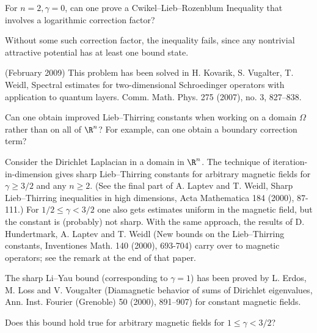 \documentclass[12pt,letterpaper, reqno]{amsart}
\begin{document}
\begin{problemblock}


\begin{problem}[2.5] 
For $n=2, \gamma=0$, can one
prove a Cwikel--Lieb--Rozenblum Inequality that involves a
logarithmic correction factor?
\end{problem}

\begin{distinguishedremark}
Without some such correction factor,
the inequality fails, since any nontrivial attractive potential has
at least one bound state.

(February 2009) This problem has been solved in H. Kovarik, S. Vugalter, T. Weidl, Spectral estimates for two-dimensional Schroedinger operators with application to quantum layers. Comm. Math. Phys. 275 (2007), no. 3, 827--838.
\end{distinguishedremark}

\end{problemblock}

\begin{problemblock}
\begin{problem}[2.53] 
 Can one obtain improved
Lieb--Thirring constants when working on a domain $\Omega$ rather
than on all of $\R^n$? For example, can one obtain a boundary
correction term?
\end{problem}
\end{problemblock}

\begin{problemblock}
Consider the Dirichlet Laplacian in a domain
in $\R^n$. The technique of iteration-in-dimension gives sharp
Lieb--Thirring constants for arbitrary magnetic fields for $\gamma
\geq 3/2$ and any $n \geq 2$. (See the final part of A. Laptev and
T. Weidl, Sharp Lieb--Thirring inequalities in high
dimensions, Acta Mathematica 184 (2000), 87-111.) For $1/2 \leq
\gamma < 3/2$ one also gets estimates uniform in the magnetic field,
but the constant is (probably) not sharp. With the same approach,
the results of D. Hundertmark, A. Laptev and T. Weidl (New
bounds on the Lieb--Thirring constants, Inventiones Math. 140
(2000), 693-704) carry over to magnetic operators; see the remark at
the end of that paper.

The sharp Li--Yau bound (corresponding to $\gamma=1$) has been
proved by L. Erdos, M. Loss and V. Vougalter (Diamagnetic
behavior of sums of Dirichlet eigenvalues, Ann. Inst. Fourier
(Grenoble) 50 (2000), 891--907) for constant magnetic fields.

\begin{problem}[2.55] 
 Does
this bound hold true for arbitrary magnetic fields for $1\leq\gamma<3/2$?
\end{problem}
\end{problemblock}
\end{document}
